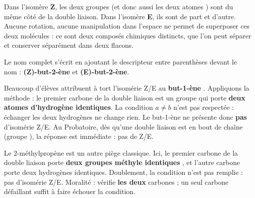 \documentclass[11pt]{article}
\begin{document}
Dans l'isomère \textbf{Z}, les deux groupes  (et donc aussi les deux atomes ) sont du même côté de la double liaison. Dans l'isomère \textbf{E}, ils sont de part et d'autre. Aucune rotation, aucune manipulation dans l'espace ne permet de superposer ces deux molécules : ce sont deux composés chimiques distincts, que l'on peut séparer et conserver séparément dans deux flacons.

Le nom complet s'écrit en ajoutant le descripteur entre parenthèses devant le nom : \textbf{(Z)-but-2-ène} et \textbf{(E)-but-2-ène}.

\begin{attention}
Beaucoup d'élèves attribuent à tort l'isomérie Z/E au \textbf{but-1-ène} . Appliquons la méthode : le premier carbone de la double liaison est un groupe  qui porte \textbf{deux atomes d'hydrogène identiques}. La condition $a \neq b$ n'est pas respectée : échanger les deux hydrogènes ne change rien. Le but-1-ène ne présente donc \textbf{pas} d'isomérie Z/E. Au Probatoire, dès qu'une double liaison est en bout de chaîne (groupe ), la réponse est immédiate : pas de Z/E.
\end{attention}

\begin{attention}
Le 2-méthylpropène  est un autre piège classique. Ici, le premier carbone de la double liaison porte \textbf{deux groupes méthyle identiques} , et l'autre carbone porte deux hydrogènes identiques. Doublement, la condition n'est pas remplie : pas d'isomérie Z/E. Moralité : vérifie \textbf{les deux} carbones ; un seul carbone défaillant suffit à faire échouer la condition.
\end{attention}
\end{document}
